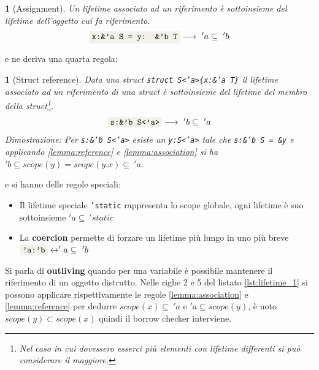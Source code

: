 \documentclass[Lau,binding=0.6cm]{sapthesis}
\newtheorem{lemma}[theorem]{}
\newcommand{\textcode}[1]{\colorbox{backcolour}{\texttt{#1}}}
\begin{document}
\begin{lemma}[Assignment] \label{lemma:assignment}
    Un lifetime associato ad un riferimento è sottoinsieme del lifetime dell'oggetto cui fa riferimento.
    \begin{equation*}
        \textnormal{\textcode{x:\&'a S = y: \&'b T}} \longrightarrow \ 'a \subseteq \ 'b
    \end{equation*}
\end{lemma}

e ne deriva una quarta regola:

\begin{lemma}[Struct reference] \label{lemma:struct_reference}
    Data una struct \textnormal{\textcode{struct S<'a>\{x:\&'a T\}}} il lifetime associato ad un riferimento di una struct è sottoinsieme del lifetime del membro della struct\footnote{Nel caso in cui dovessero esserci più elementi con lifetime differenti si può considerare il maggiore.}.
    \begin{equation*}
        \textnormal{\textcode{s:\&'b S<'a>}} \longrightarrow \ 'b \subseteq \ 'a
    \end{equation*}
    Dimostrazione: \textnormal{Per \textnormal{\textcode{s:\&'b S<'a>}} esiste un \textcode{y:S<'a>} tale che \textcode{s:\&'b S = \&y} e applicando \ref{lemma:reference} e \ref{lemma:association} si ha} $ 'b \subseteq scope(y) = scope(y.x) \subseteq \ 'a  $.
\end{lemma}


e si hanno delle regole speciali:
\begin{itemize}
    \item Il lifetime speciale \textcode{'static} rappresenta lo scope globale, ogni lifetime è suo sottoinsieme $ 'a \subseteq \ 'static $
    \item La \textbf{coercion} permette di forzare un lifetime più lungo in uno più breve $ \textnormal{\textcode{'a:'b}} \leftrightarrow 'a \subseteq \ 'b $
\end{itemize}

Si parla di \textbf{outliving} quando per una variabile è possibile mantenere il riferimento di un oggetto distrutto. 
Nelle righe 2 e 5 del listato \ref{lst:lifetime_1} si possono applicare rispettivamente le regole \ref{lemma:association} e \ref{lemma:reference} per dedurre $ scope(x) \subseteq \ 'a $ e $ 'a \subseteq scope(y) $, è noto $ scope(y) \subset scope(x) $ quindi il borrow checker interviene.
\end{document}
